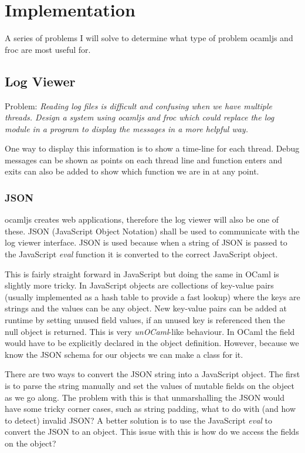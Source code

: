 \chapter{Implementation}
A series of problems I will solve to determine what type of problem ocamljs and froc are most useful for.
\section{Log Viewer}
Problem: \emph{Reading log files is difficult and confusing when we have multiple threads. Design a system using ocamljs and froc which could replace the log module in a program to display the messages in a more helpful way.}

One way to display this information is to show a time-line for each thread. Debug messages can be shown as points on each thread line and function enters and exits can also be added to show which function we are in at any point.

\subsection{JSON}
ocamljs creates web applications, therefore the log viewer will also be one of these. JSON (JavaScript Object Notation) shall be used to communicate with the log viewer interface. JSON is used because when a string of JSON is passed to the JavaScript \emph{eval} function it is converted to the correct JavaScript object.

This is fairly straight forward in JavaScript but doing the same in OCaml is slightly more tricky. In JavaScript objects are collections of key-value pairs (usually implemented as a hash table to provide a fast lookup) where the keys are strings and the values can be any object. New key-value pairs can be added at runtime by setting unused field values, if an unused key is referenced then the null object is returned. This is very \emph{unOCaml}-like behaviour. In OCaml the field would have to be explicitly declared in the object definition. However, because we know the JSON schema for our objects we can make a class for it.

There are two ways to convert the JSON string into a JavaScript object. The first is to parse the string manually and set the values of mutable fields on the object as we go along. The problem with this is that unmarshalling the JSON would have some tricky corner cases, such as string padding, what to do with (and how to detect) invalid JSON? A better solution is to use the JavaScript \emph{eval} to convert the JSON to an object. This issue with this is how do we access the fields on the object?

